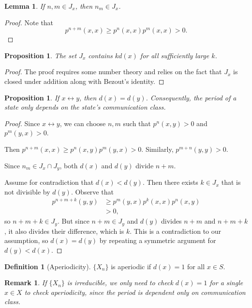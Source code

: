 \documentclass{tufte-handout}
\newtheorem{lemma}[thm]{Lemma}
\newtheorem{rmk}[thm]{Remark}
\newtheorem{prop}[thm]{Proposition}
\theoremstyle{definition}
\newtheorem{defn}[thm]{Definition}
\begin{document}
\begin{lemma}
	If $n,m \in J_x$, then $n_m \in J_x$.
\end{lemma}

\begin{proof}
	Note that
	\[
		p^{n+m}(x,x) \ge p^{n}(x,x)p^{m}(x,x) > 0
	.\]
\end{proof}

\begin{prop}
	The set $J_x$ contains $kd(x)$ for all sufficiently large $k$.
\end{prop}

\begin{proof}
	The proof requires some number theory and relies on the fact that $J_x$ is closed under addition along with Bezout's identity.
\end{proof}

\begin{prop}
	If $x \leftrightarrow y$, then $d(x) = d(y)$. Consequently, the period of a state only depends on the state's communication class.
\end{prop}

\begin{proof}
	Since $x \leftrightarrow y$, we can choose $n,m$ such that $p^n(x,y) > 0$ and $p^m(y,x) > 0$.

	Then $p^{n+m}(x,x) \ge p^{n}(x,y)p^m(y,x) > 0$.
	Similarly, $p^{m+n}(y,y) > 0$. 

	Since $n_m \in J_x \cap J_y$, both $d(x)$ and $d\left(y \right)$ divide $n+m$.

	Assume for contradiction that $d(x) < d(y)$. Then there exists $k \in J_x$ that is not divisible by $d(y)$. Observe that
	\begin{align*}
		p^{n+m+k}(y,y) &\ge p^m(y,x)p^k(x,x)p^n(x,y) \\
					   &> 0
	,\end{align*} so $n+m+k \in J_y$. But since $n+m \in J_y$ and $d(y)$ divides $n+m$ and $n+m+k$, it also divides their difference, which is $k$. This is a contradiction to our assumption, so $d(x) = d(y)$ by repeating a symmetric argument for $d(y) < d(x)$.
\end{proof}

\begin{defn}[Aperiodicity]
	$\{X_n\}$ is aperiodic if $d(x) = 1$ for all $x \in S$.
\end{defn}

\begin{rmk}
	If $\{X_n\}$ is irreducible, we only need to check $d(x) = 1$ for a single $x \in X$ to check aperiodicity, since the period is dependent only on communication class.
\end{rmk}
\end{document}
